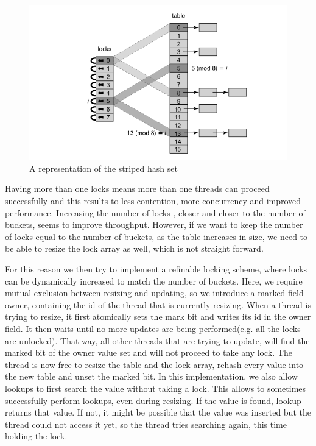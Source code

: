 \begin{figure}
 \centering
  \includegraphics[scale=0.5]{striped_hash_set.png}
\caption{A representation of the striped hash set}
\label{striped_hash_set}
\end{figure}


Having more than one locks means more than one threads can proceed  successfully and this results to less contention, more concurrency and improved performance. Increasing the number of locks , closer and closer to the number of buckets, seems to improve throughput. However, if we want to keep the number of locks equal to the number of buckets, as the table increases in size, we need to be able to resize the lock array as well, which is not straight forward.

For this reason we then try to implement a refinable locking scheme, where locks can be dynamically increased to match the number of buckets. Here, we require mutual exclusion between resizing and updating, so we introduce a marked field owner, containing the id of the thread that is currently resizing. When a thread is trying to resize, it first atomically sets the mark bit and writes its id in the owner field. It then waits until no more updates are being performed(e.g. all the locks are unlocked). That way, all other threads that are trying to update, will find the marked bit of the owner value set and will not proceed to take any lock. The thread is now free to resize the table and the lock array, rehash every value into the new table and unset the marked bit. In this implementation, we also allow lookups to first search the value without taking a lock. This allows to sometimes successfully perform lookups, even during resizing. If the value is found, lookup returns that value. If not, it might be possible that the value was inserted but the thread could not access it yet, so the thread tries searching again, this time holding the lock. 

